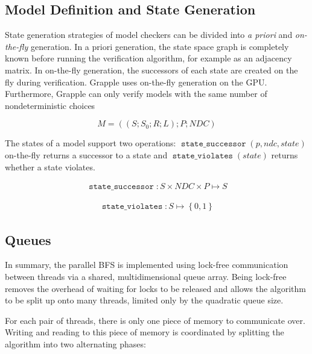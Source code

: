 \documentclass[
fancyheadings, %
%
%
]{stsreprt}
\DeclareMathOperator{\sSuccessor}{\texttt{state\_successor}}
\DeclareMathOperator{\sViolates}{\texttt{state\_violates}}
\begin{document}

\subsection{Model Definition and State Generation}
\label{section:theory:model-definition-state-generation}

State generation strategies of model checkers can be divided into \emph{a priori} and \emph{on-the-fly} generation.
In a priori generation, the state space graph is completely known before running the verification algorithm, for example as an adjacency matrix.
In on-the-fly generation, the successors of each state are created on the fly during verification.
Grapple uses on-the-fly generation on the GPU.
Furthermore, Grapple can only verify models with the same number of nondeterministic choices

\[M = \left(\left(S; S_0; R; L\right); P; \mathit{NDC}\right)\]

The states of a model support two operations: $\sSuccessor(p, ndc, state)$ on-the-fly returns a successor to a state and $\sViolates(state)$ returns whether a state violates.

\begin{align*}
    \sSuccessor
    : S \times \mathit{NDC} \times \mathit{P}
    \mapsto S
\end{align*}

\begin{align*}
    \sViolates
    : S
    \mapsto \left\{0, 1\right\}
\end{align*}

\subsection{Queues}
\label{section:theory:queues}

In summary, the parallel BFS is implemented using lock-free communication between threads via a shared, multidimensional queue array.
Being lock-free removes the overhead of waiting for locks to be released and allows the algorithm to be split up onto many threads, limited only by the quadratic queue size.

For each pair of threads, there is only one piece of memory to communicate over.
Writing and reading to this piece of memory is coordinated by splitting the algorithm into two alternating phases:
\end{document}

